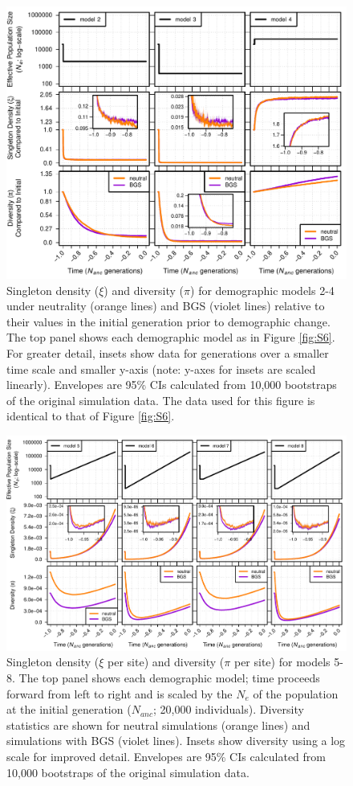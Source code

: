 \documentclass[9pt,twocolumn,twoside]{rilabRxiv}
\begin{document}
\begin{figure}[t]
\includegraphics[width=.9\linewidth]{figures/FigS9.pdf}
\caption{Singleton density ($\xi$) and diversity ($\pi$) for demographic models 2-4 under neutrality (orange lines) and BGS (violet lines) relative to their values in the initial generation prior to demographic change.
The top panel shows each demographic model as in Figure \ref{fig:S6}.
For greater detail, insets show data for generations over a smaller time scale and smaller y-axis (note: y-axes for insets are scaled linearly).
Envelopes are 95\% CIs calculated from 10,000 bootstraps of the original simulation data.
The data used for this figure is identical to that of Figure \ref{fig:S6}.}
\label{fig:S9}
\end{figure}
\pagebreak

\begin{figure}[t]
\includegraphics[width=\linewidth]{figures/FigS4.pdf}
\caption{Singleton density ($\xi$ per site) and diversity ($\pi$ per site) for models 5-8.
The top panel shows each demographic model; time proceeds forward from left to right and is scaled by the $N_e$ of the population at the initial generation ($N_{anc}$; 20,000 individuals).
Diversity statistics are shown for neutral simulations (orange lines) and simulations with BGS (violet lines).
Insets show diversity using a log scale for improved detail.
Envelopes are 95\% CIs calculated from 10,000 bootstraps of the original simulation data.}
\label{fig:S4}
\end{figure}
\pagebreak
\end{document}
